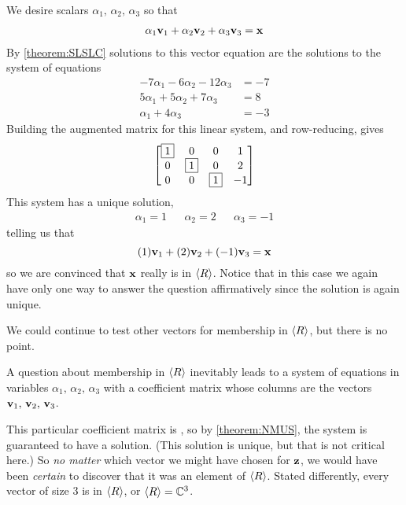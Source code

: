 \documentclass{ximera}
\begin{document}
\begin{example}
\begin{question}
    \begin{feedback}[correct]
      We desire scalars $\alpha_1,\,\alpha_2,\,\alpha_3$ so that
      \begin{align*}
        \alpha_1\mathbf{v}_1+\alpha_2\mathbf{v}_2+\alpha_3\mathbf{v}_3&=\mathbf{x}\\
      \end{align*}
      By \ref{theorem:SLSLC} solutions to this vector equation are the solutions to the system of equations
      \begin{align*}
        -7\alpha_1-6\alpha_2-12\alpha_3&=-7\\
        5\alpha_1+5\alpha_2+7\alpha_3&=8\\
        \alpha_1+4\alpha_3&=-3
      \end{align*}
      Building the augmented matrix for this linear system, and row-reducing, gives
      \[
        \begin{bmatrix}
          \fbox{1} & 0 & 0 & 1 \\
          0 & \fbox{1} & 0 & 2 \\
          0 & 0 & \fbox{1} & -1
        \end{bmatrix}
      \]
      This system has a unique solution,
      \begin{align*}
        \alpha_1 = 1&&\alpha_2 = 2&&\alpha_3 = -1
      \end{align*}
      telling us that
      \[
        (1)\mathbf{v}_1+(2)\mathbf{v}_2+(-1)\mathbf{v}_3=\mathbf{x}
      \]
      so we are convinced that $\mathbf{x}$ really is in $\left\langle R\right\rangle$.
      Notice that in this case we again have only one way to answer the
      question affirmatively since the solution is again unique.
    \end{feedback}
  \end{question}

  \begin{question}
    We could continue to test other vectors for membership in $\left\langle R\right\rangle$,
    but there is no point.

    A question about membership in $\left\langle R\right\rangle$ inevitably leads to a
    system of  equations in  variables
    $\alpha_1,\,\alpha_2,\,\alpha_3$ with a coefficient matrix whose
    columns are the vectors $\mathbf{v}_1,\,\mathbf{v}_2,\,\mathbf{v}_3$.

    This particular coefficient matrix is
    , so by
    \ref{theorem:NMUS}, the system is guaranteed to have a solution.
    (This solution is unique, but that is not critical here.)  So
    \textit{no matter} which vector we might have chosen for
    $\mathbf{z}$, we would have been \textit{certain} to discover that
    it was an element of $\left\langle R\right\rangle$.  Stated differently, every vector
    of size 3 is in $\left\langle R\right\rangle$, or $\left\langle R\right\rangle=\mathbb{C}^{3}$.
  \end{question}
\end{example}
\end{document}
